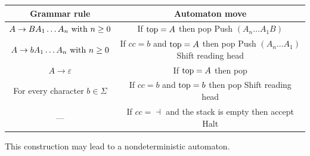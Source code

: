 \begin{table}[H]
    \centering
    \begin{tabular}{|cc|}
    \hline
    \textbf{Grammar rule}                                      & \textbf{Automaton move}                                                                                    \\ \hline
    $A \rightarrow B A_1\dots A_n \textnormal{ with }n \geq 0$ & \makecell{If $\textnormal{top}=A$ then pop \\ Push $(A_n \dots A_1B)$}                                     \\ \hline
    $A \rightarrow b A_1\dots A_n \textnormal{ with }n \geq 0$ & \makecell{If $cc=b$ and $\textnormal{top}=A$ then pop \\ Push $(A_n \dots A_1)$ \\ Shift reading head}     \\ \hline
    $A \rightarrow \varepsilon$                                & If $\textnormal{top}=A$ then pop                                                                           \\ \hline
    For every character $b \in \Sigma$                         & \makecell{If $cc=b$ and $\textnormal{top}=b$ then pop \\ Shift reading head}                               \\ \hline
    ---                                                        & \makecell{If $cc=\dashv$ and the stack is empty then accept \\ Halt}                                       \\ \hline
    \end{tabular}
\end{table}
This construction may lead to a nondeterministic automaton. 
